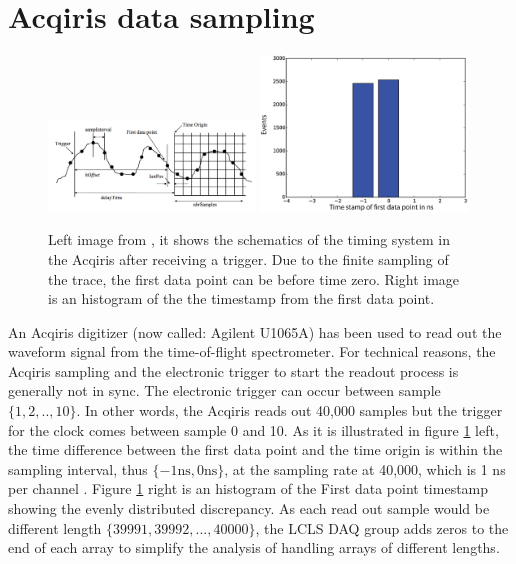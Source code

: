 \section{Acqiris data sampling}
\begin{figure}
	\centering
		\includegraphics[width=0.49\textwidth]{images/Acqiris-waveform-readout.png}
		\includegraphics[width=0.49\textwidth]{images/firstDataPoint.eps}
	\caption[First data point in Acqiris sampling.]{Left image from \citep{Acqiris-manual}, it shows the schematics of the timing system in the Acqiris after receiving a trigger. Due to the finite sampling of the trace, the first data point can be before time zero. Right image is an histogram of the the timestamp from the first data point.}
	\label{fig:Acqiris-waveform-readout}
\end{figure}
An Acqiris digitizer (now called: Agilent U1065A) has been used to read out the waveform signal from the time-of-flight spectrometer. For technical reasons, the Acqiris sampling and the electronic trigger to start the readout process is generally not in sync. The electronic trigger can occur between sample $\{1,2,..,10\}$. In other words, the Acqiris reads out 40,000 samples but the trigger for the clock comes between sample 0 and 10. As it is illustrated in figure \ref{fig:Acqiris-waveform-readout} left, the time difference between the first data point and the time origin is within the sampling interval, thus $\{-1 \text{ns}, 0 \text{ns}\}$, at the sampling rate at 40,000, which is 1 ns per channel \citep{Acqiris-manual}. Figure \ref{fig:Acqiris-waveform-readout} right is an histogram of the First data point timestamp showing the evenly distributed discrepancy. As each read out sample would be different length $\{39991,39992,...,40000\}$, the LCLS DAQ group adds zeros to the end of each array to simplify the analysis of handling arrays of different lengths.\\
